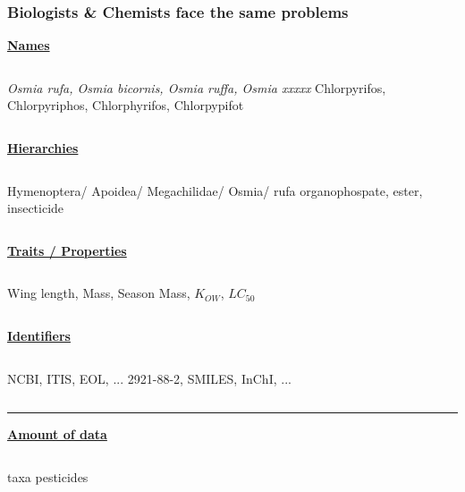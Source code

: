 \documentclass[
	12pt
	]{beamer}
\begin{document}
\begin{frame}
\frametitle{Biologists \& Chemists face the same problems}
	\small
	\centering
	\pause
	\textbf{\alert{\underline{Names}}}
	\begin{columns}[t]
	\emph{Osmia rufa, Osmia bicornis, Osmia ruffa, Osmia xxxxx} 
	Chlorpyrifos, Chlorpyriphos, Chlorphyrifos, Chlorpypifot
	\end{columns}
	\pause

	\centering
	\textbf{\alert{\underline{Hierarchies}}}
	\begin{columns}[t]
	Hymenoptera/ Apoidea/ Megachilidae/ Osmia/ rufa 
	organophospate, ester, insecticide
	\end{columns}
	\pause

	\centering
	\textbf{\alert{\underline{Traits / Properties}}}
	\begin{columns}[t]
	Wing length, Mass, Season 
	Mass, $K_{OW}$, $LC_{50}$
	\end{columns}
	\pause

	\centering
	\textbf{\alert{\underline{Identifiers}}}
	\begin{columns}[t]
	NCBI, ITIS, EOL, ... 
	2921-88-2, SMILES, InChI, ...
	\end{columns}
	\pause

	\rule{\textwidth}{1pt}
	\textbf{\alert{\underline{Amount of data}}}

	\begin{columns}[t]
	 taxa
	 pesticides
	\end{columns}
\end{frame}
\end{document}
